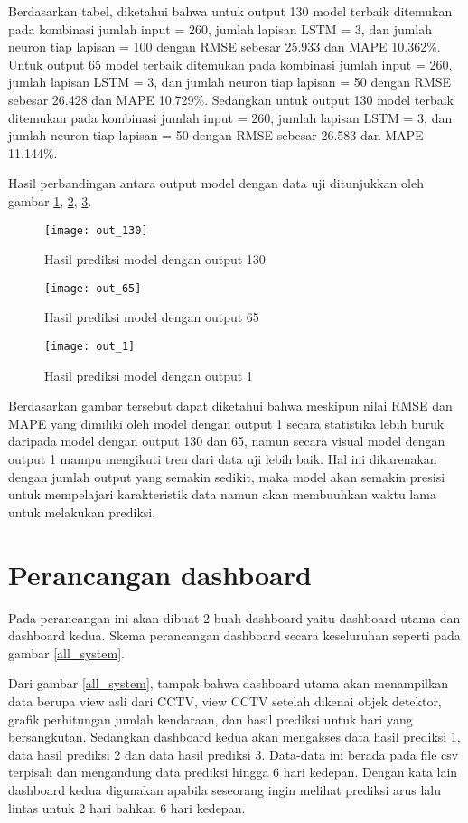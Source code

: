 \documentclass[../thesis.tex]{subfiles}
\begin{document}
Berdasarkan tabel, diketahui bahwa untuk output 130 model terbaik ditemukan pada kombinasi jumlah input = 260, jumlah lapisan LSTM = 3, dan jumlah neuron tiap lapisan = 100 dengan RMSE sebesar 25.933 dan MAPE 10.362\%. Untuk output 65 model terbaik ditemukan pada kombinasi jumlah input = 260, jumlah lapisan LSTM = 3, dan jumlah neuron tiap lapisan = 50 dengan RMSE sebesar 26.428 dan MAPE 10.729\%.
Sedangkan untuk output 130 model terbaik ditemukan pada kombinasi jumlah input = 260, jumlah lapisan LSTM = 3, dan jumlah neuron tiap lapisan = 50 dengan RMSE sebesar 26.583 dan MAPE 11.144\%.

Hasil perbandingan antara output model dengan data uji ditunjukkan oleh gambar \ref{out_130}, \ref{out_65}, \ref{out_1}.
\begin{figure}[htp]
	\centering
	\texttt{[image: out\_130]}
	\caption{Hasil prediksi model dengan output 130}
	\label{out_130}
\end{figure}

\begin{figure}[htp]
	\centering
	\texttt{[image: out\_65]}
	\caption{Hasil prediksi model dengan output 65}
	\label{out_65}
\end{figure}

\begin{figure}[htp]
	\centering
	\texttt{[image: out\_1]}
	\caption{Hasil prediksi model dengan output 1}
	\label{out_1}
\end{figure}
Berdasarkan gambar tersebut dapat diketahui bahwa meskipun nilai RMSE dan MAPE yang dimiliki oleh model dengan output 1 secara statistika lebih buruk daripada model dengan output 130 dan 65, namun secara visual model dengan output 1 mampu mengikuti tren dari data uji lebih baik. Hal ini dikarenakan dengan jumlah output yang semakin sedikit, maka model akan semakin presisi untuk mempelajari karakteristik data namun
akan membuuhkan waktu lama untuk melakukan prediksi. 

\section{Perancangan dashboard}
Pada perancangan ini akan dibuat 2 buah dashboard yaitu dashboard utama dan dashboard kedua. Skema perancangan dashboard secara keseluruhan seperti pada gambar \ref{all_system}.

Dari gambar \ref{all_system}, tampak bahwa dashboard utama akan menampilkan data berupa view asli dari CCTV, view CCTV setelah dikenai objek detektor, grafik perhitungan jumlah kendaraan, dan hasil prediksi untuk hari yang bersangkutan.
Sedangkan dashboard kedua akan mengakses data hasil prediksi 1, data hasil prediksi 2 dan data hasil prediksi 3. Data-data ini berada pada file csv terpisah dan mengandung data prediksi hingga 6 hari kedepan. Dengan kata lain dashboard kedua digunakan
apabila seseorang ingin melihat prediksi arus lalu lintas untuk 2 hari bahkan 6 hari kedepan.
\end{document}
